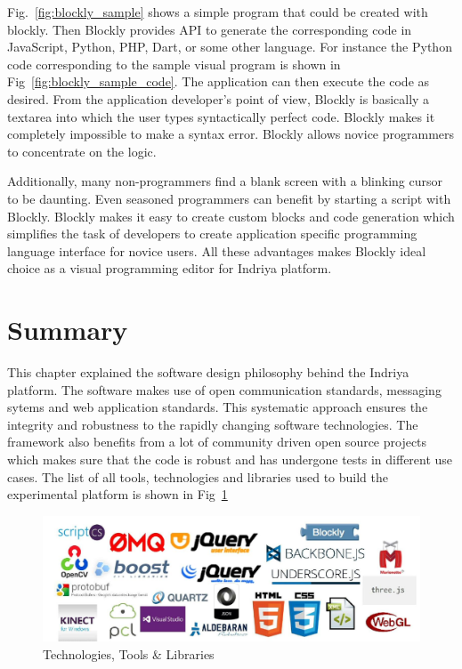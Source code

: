 Fig.~\ref{fig:blockly_sample} shows a simple program that could be created with blockly. Then Blockly provides API to generate the corresponding code in JavaScript, Python, PHP, Dart, or some other language. For instance the Python code corresponding to the sample visual program is shown in Fig~\ref{fig:blockly_sample_code}. The application can then execute the code as desired. From the application developer's point of view, Blockly is basically a textarea into which the user types syntactically perfect code. Blockly makes it completely impossible to make a syntax error. Blockly allows novice programmers to concentrate on the logic.

Additionally, many non-programmers find a blank screen with a blinking cursor to be daunting. Even seasoned programmers can benefit by starting a script with Blockly. Blockly makes it easy to create custom blocks and code generation which simplifies the task of developers to create application specific programming language interface for novice users. All these advantages makes Blockly ideal choice as a visual programming editor for Indriya platform.
\section{Summary}
This chapter explained the software design philosophy behind the Indriya platform. The software makes use of open communication standards, messaging sytems and web application standards. This systematic approach ensures the integrity and robustness to the rapidly changing software technologies. The framework also benefits from a lot of community driven open source projects which makes sure that the code is robust and has undergone tests in different use cases. The list of all tools, technologies and libraries used to build the experimental platform is shown in Fig~\ref{fig:libraries_used}
\begin{figure}
\centering
\includegraphics[width=\textwidth]{assets/libs.jpg}
\caption[Technologies, Tools \& Libraries]{Technologies, Tools \& Libraries}
\label{fig:libraries_used}
\end{figure}
